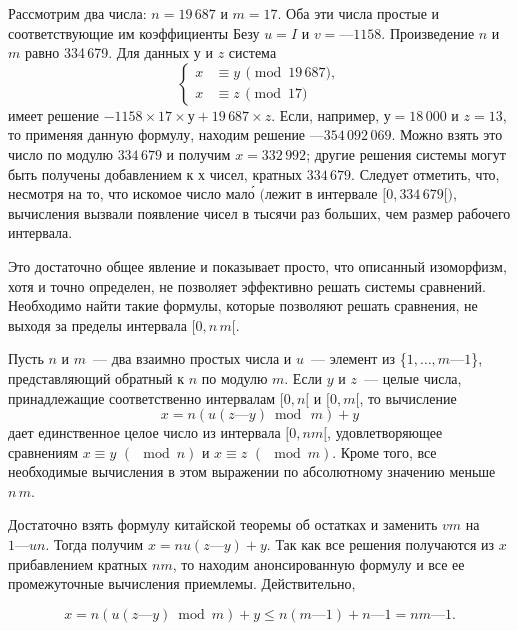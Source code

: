 \documentclass{../../template/mai_book}
\begin{document}
    \begin{beznomera}
    \hspace*{0.5cm}
    Рассмотрим два числа: $n = 19\,687$ и $m = 17$. Оба эти числа простые и соответствующие им коэффициенты Безу $u = I$ и $v = —1158$. Произведение $n$ и $m$ равно 334\,679. Для данных $у$ и $z$ система
    \[
    \left\{
    \begin{aligned}
    x &\equiv y\,\pmod{19\,687},\\
    x &\equiv z\,\pmod{17}
    \end{aligned}
    \right.
    \]
    имеет решение $-1158 \times 17 \times у + 19\,687 \times z$. Если, например, $у = 18\,000$ и $z = 13$, то применяя данную формулу, находим решение $—354\,092\,069$. Можно взять это число по модулю $334\,679$ и получим $x = 332\,992$; другие решения системы могут быть получены добавлением к $х$ чисел, кратных $334\,679$. Следует отметить, что, несмотря на то, что искомое число мало́ $($лежит в интервале $[0, 334\,679 [)$, вычисления вызвали появление чисел в тысячи раз больших, чем размер рабочего интервала.\quad \quad \quad \quad \quad \quad \quad \quad \quad \quad \quad \quad \quad \quad \quad \quad \quad \quad \quad \quad \quad \qedsymbol

    Это достаточно общее явление и показывает просто, что описанный изоморфизм, хотя и точно определен, не позволяет эффективно решать системы сравнений. Необходимо найти такие формулы, которые позволяют решать сравнения, не выходя за пределы интервала $[0,n\,m [$.
    \end{beznomera}

    \begin{bezpodpisi}
    \hspace*{0.5cm}
    Пусть $n$ и $m$~— два взаимно простых числа и $u$~— элемент из \{$1,\ldots,m — 1$\}, представляющий обратный к $n$ по модулю $m$. Если $y$ и $z$~— целые числа, принадлежащие соответственно интервалам $[0, n [$ и $[0, m [$, то вычисление
    $$ x = n ( u (z — y) \bmod\,m) + y$$
    дает единственное целое число из интервала $[0, nm [$, удовлетворяющее сравнениям $x \equiv y\,\,(\!\!\!\mod{n})$ и $x \equiv z\,\,(\!\!\!\mod{m})$. Кроме того, все необходимые вычисления в этом
    выражении по абсолютному значению меньше $n\,m$.
    \end{bezpodpisi}

    \begin{myproof}
    Достаточно взять формулу китайской теоремы об остатках и заменить $vm$ на $1 — un$. Тогда получим $x = nu(z — y) + y$. Так как все решения получаются из $x$ прибавлением кратных $nm$, то находим анонсированную формулу и все ее промежуточные вычисления приемлемы. Действительно,

    $$ x = n(u(z — y) \bmod m) + y \leqslant n(m — 1) + n — 1 = nm — 1. $$
    \end{myproof}
\end{document}
